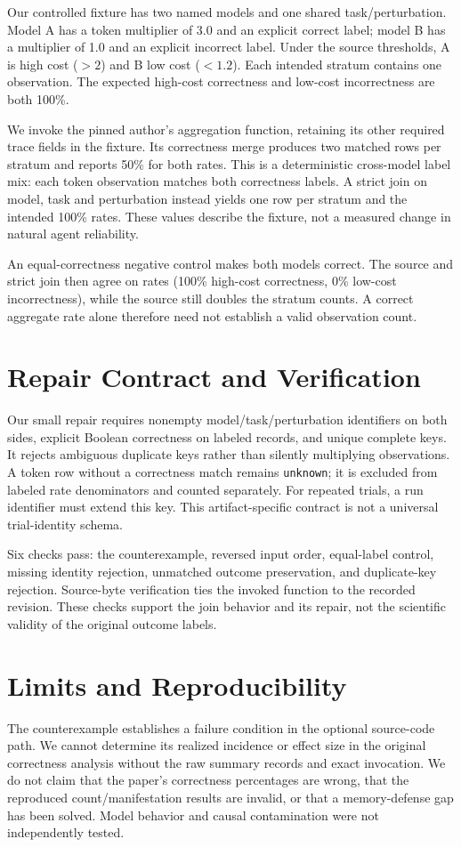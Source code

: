 \documentclass[sigconf,nonacm]{acmart}
\begin{document}
Our controlled fixture has two named models and one shared task/perturbation. Model A has a token multiplier of 3.0 and an explicit correct label; model B has a multiplier of 1.0 and an explicit incorrect label. Under the source thresholds, A is high cost ($>2$) and B low cost ($<1.2$). Each intended stratum contains one observation. The expected high-cost correctness and low-cost incorrectness are both 100\%.

We invoke the pinned author's aggregation function, retaining its other required trace fields in the fixture. Its correctness merge produces two matched rows per stratum and reports 50\% for both rates. This is a deterministic cross-model label mix: each token observation matches both correctness labels. A strict join on model, task and perturbation instead yields one row per stratum and the intended 100\% rates. These values describe the fixture, not a measured change in natural agent reliability.

An equal-correctness negative control makes both models correct. The source and strict join then agree on rates (100\% high-cost correctness, 0\% low-cost incorrectness), while the source still doubles the stratum counts. A correct aggregate rate alone therefore need not establish a valid observation count.

\section{Repair Contract and Verification}
Our small repair requires nonempty model/task/perturbation identifiers on both sides, explicit Boolean correctness on labeled records, and unique complete keys. It rejects ambiguous duplicate keys rather than silently multiplying observations. A token row without a correctness match remains \texttt{unknown}; it is excluded from labeled rate denominators and counted separately. For repeated trials, a run identifier must extend this key. This artifact-specific contract is not a universal trial-identity schema.

Six checks pass: the counterexample, reversed input order, equal-label control, missing identity rejection, unmatched outcome preservation, and duplicate-key rejection. Source-byte verification ties the invoked function to the recorded revision. These checks support the join behavior and its repair, not the scientific validity of the original outcome labels.

\section{Limits and Reproducibility}
The counterexample establishes a failure condition in the optional source-code path. We cannot determine its realized incidence or effect size in the original correctness analysis without the raw summary records and exact invocation. We do not claim that the paper's correctness percentages are wrong, that the reproduced count/manifestation results are invalid, or that a memory-defense gap has been solved. Model behavior and causal contamination were not independently tested.
\end{document}

